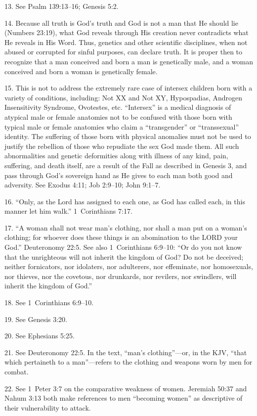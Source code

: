 \documentclass[
]{book}
\begin{document}
13. See Psalm 139:13--16; Genesis 5:2.

14. Because all truth is God's truth and God is not a man that He should lie (Numbers 23:19), what God reveals through His creation never contradicts what He reveals in His Word. Thus, genetics and other scientific disciplines, when not abused or corrupted for sinful purposes, can declare truth. It is proper then to recognize that a man conceived and born a man is genetically male, and a woman conceived and born a woman is genetically female.

15. This is not to address the extremely rare case of intersex children born with a variety of conditions, including: Not XX and Not XY, Hypospadias, Androgen Insensitivity Syndrome, Ovotestes, etc. ``Intersex'' is a medical diagnosis of atypical male or female anatomies not to be confused with those born with typical male or female anatomies who claim a ``transgender'' or ``transsexual'' identity. The suffering of those born with physical anomalies must not be used to justify the rebellion of those who repudiate the sex God made them. All such abnormalities and genetic deformities along with illness of any kind, pain, suffering, and death itself, are a result of the Fall as described in Genesis 3, and pass through God's sovereign hand as He gives to each man both good and adversity. See Exodus 4:11; Job 2:9--10; John 9:1--7.

16. ``Only, as the Lord has assigned to each one, as God has called each, in this manner let him walk.'' 1~Corinthians 7:17.

17. ``A woman shall not wear man's clothing, nor shall a man put on a woman's clothing; for whoever does these things is an abomination to the LORD your God.'' Deuteronomy 22:5. See also 1~Corinthians 6:9--10: ``Or do you not know that the unrighteous will not inherit the kingdom of God? Do not be deceived; neither fornicators, nor idolaters, nor adulterers, nor effeminate, nor homosexuals, nor thieves, nor the covetous, nor drunkards, nor revilers, nor swindlers, will inherit the kingdom of God.''

18. See 1~Corinthians 6:9--10.

19. See Genesis 3:20.

20. See Ephesians 5:25.

21. See Deuteronomy 22:5. In the text, ``man's clothing''---or, in the KJV, ``that which pertaineth to a man''---refers to the clothing and weapons worn by men for combat.

22. See 1~Peter 3:7 on the comparative weakness of women. Jeremiah 50:37 and Nahum 3:13 both make references to men ``becoming women'' as descriptive of their vulnerability to attack.
\end{document}

